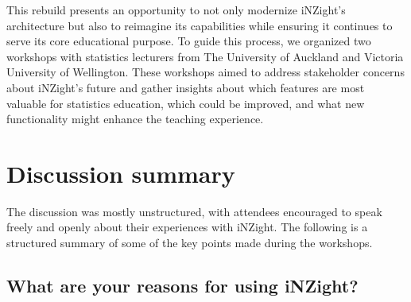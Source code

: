 \documentclass{article}
\begin{document}
This rebuild presents an opportunity to not only modernize iNZight's architecture but also to reimagine its capabilities while ensuring it continues to serve its core educational purpose.
To guide this process, we organized two workshops with statistics lecturers from The University of Auckland and Victoria University of Wellington.
These workshops aimed to address stakeholder concerns about iNZight's future and gather insights about which features are most valuable for statistics education, which could be improved, and what new functionality might enhance the teaching experience.


\section{Discussion summary}

The discussion was mostly unstructured, with attendees encouraged to speak freely and openly about their experiences with iNZight.
The following is a structured summary of some of the key points made during the workshops.

\subsection{What are your reasons for using iNZight?}
\end{document}
